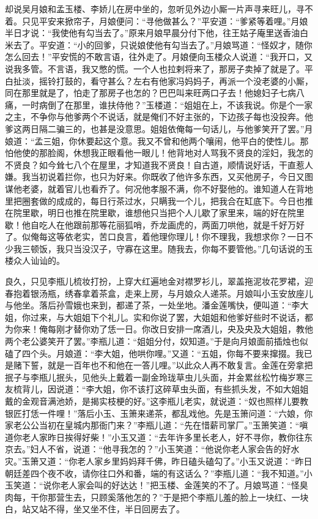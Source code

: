 却说吴月娘和孟玉楼、李娇儿在房中坐的，忽听见外边小厮一片声寻来旺儿，寻不着。只见平安来掀帘子，月娘便问：“寻他做甚么？”平安道：“爹紧等着哩。”月娘半日才说：“我使他有勾当去了。”原来月娘早晨分付下他，往王姑子庵里送香油白米去了。平安道：“小的回爹，只说娘使他有勾当去了。”月娘骂道：“怪奴才，随你怎么回去！”平安慌的不敢言语，往外走了。月娘便向玉楼众人说道：“我开口，又说我多管。不言语，我又憋的慌。一个人也拉剌将来了，那房子卖掉了就是了。平白扯淡，摇铃打鼓的，看守甚么？左右有他家冯妈妈子，再派一个没老婆的小厮，同在那里就是了，怕走了那房子也怎的？巴巴叫来旺两口子去！他媳妇子七病八痛，一时病倒了在那里，谁扶侍他？”玉楼道：“姐姐在上，不该我说。你是个一家之主，不争你与他爹两个不说话，就是俺们不好主张的，下边孩子每也没投奔。他爹这两日隔二骗三的，也甚是没意思。姐姐依俺每一句话儿，与他爹笑开了罢。”月娘道：“孟三姐，你休要起这个意。我又不曾和他两个嚷闹，他平白的使性儿。那怕他使的那脸阁，休想我正眼看他一眼儿！他背地对人骂我不贤良的淫妇，我怎的不贤良？如今耸七八个在屋里，才知道我不贤良！自古道，顺情说好话，干直惹人嫌。我当初说着拦你，也只为好来。你既收了他许多东西，又买他房子，今日又图谋他老婆，就着官儿也看乔了。何况他孝服不满，你不好娶他的。谁知道人在背地里把圈套做的成成的，每日行茶过水，只瞒我一个儿，把我合在缸底下。今日也推在院里歇，明日也推在院里歇，谁想他只当把个人儿歇了家里来，端的好在院里歇！他自吃人在他跟前那等花丽狐哨，乔龙画虎的，两面刀哄他，就是千好万好了。似俺每这等依老实，苦口良言，着他理你理儿！你不理我，我想求你？一日不少我三顿饭，我只当没汉子，守寡在这里。随我去，你每不要管他。”几句话说的玉楼众人讪讪的。

良久，只见李瓶儿梳妆打扮，上穿大红遍地金对襟罗衫儿，翠盖拖泥妆花罗裙，迎春抱着银汤瓶，绣春拿着茶盒，走来上房，与月娘众人递茶。月娘叫小玉安放座儿与他坐。落后孙雪娥也来到，都递了茶，一处坐地。潘金莲嘴快，便叫道：“李大姐，你过来，与大姐姐下个礼儿。实和你说了罢，大姐姐和他爹好些时不说话，都为你来！俺每刚才替你劝了恁一日。你改日安排一席酒儿，央及央及大姐姐，教他两个老公婆笑开了罢。”李瓶儿道：“姐姐分付，奴知道。”于是向月娘面前插烛也似磕了四个头。月娘道：“李大姐，他哄你哩。”又道：“五姐，你每不要来撺掇。我已是赌下誓，就是一百年也不和他在一答儿哩。”以此众人再不敢复言。金莲在旁拿把抿子与李瓶儿抿头，见他头上戴着一副金玲珑草虫儿头面，并金累丝松竹梅岁寒三友梳背儿，因说道：“李大姐，你不该打这碎草虫头面，有些抓头发，不如大姐姐戴的金观音满池娇，是揭实枝梗的好。”这李瓶儿老实，就说道：“奴也照样儿要教银匠打恁一件哩！”落后小玉、玉箫来递茶，都乱戏他。先是玉箫问道：“六娘，你家老公公当初在皇城内那衙门来？”李瓶儿道：“先在惜薪司掌厂。”玉箫笑道：“嗔道你老人家昨日挨得好柴！”小玉又道：“去年许多里长老人，好不寻你，教你往东京去。”妇人不省，说道：“他寻我怎的？”小玉笑道：“他说你老人家会告的好水灾。”玉箫又道：“你老人家乡里妈妈拜千佛，昨日磕头磕勾了。”小玉又说道：“昨日朝廷差四个夜不收，请你往口外和番，端的有这话么？”李瓶儿道：“我不知道。”小玉笑道：“说你老人家会叫的好达达！”把玉楼、金莲笑的不了。月娘骂道：“怪臭肉每，干你那营生去，只顾奚落他怎的？”于是把个李瓶儿羞的脸上一块红、一块白，站又站不得，坐又坐不住，半日回房去了。

